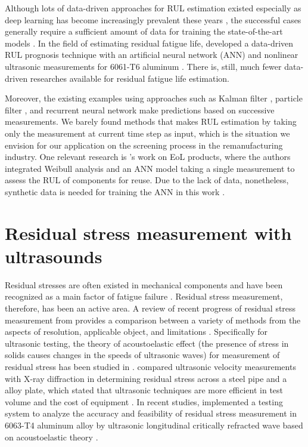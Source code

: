  Although lots of data-driven approaches for RUL estimation existed \cite{rul-review-SI20111, rul-review-LEI2018799} especially as deep learning has become increasingly prevalent these years \cite{rul-review-KHAN2018241}, the successful cases generally require a sufficient amount of data for training the state-of-the-art models \cite{rul-cnn-bearing-LI20181, rul-ensemble-bearing, rul-cnn-turbo-LI20181,rul-rnn-turbo-WU2020241, rul-gpr-battery-9040661}. In the field of estimating residual fatigue life,  developed a data-driven RUL prognosis technique with an artificial neural network (ANN) and nonlinear ultrasonic measurements for 6061-T6 aluminum \cite{rul-nn-fatigue-ultrasound-LIM2018185}. There is, still, much fewer data-driven researches available for residual fatigue life estimation. 

 Moreover, the existing examples using approaches such as Kalman filter \cite{rul-statespace-fatigue-RAY1996}, particle filter \cite{rul-statespace-fatigue-8819426}, and recurrent neural network \cite{rul-rnn-turbo-WU2020241} make predictions based on successive measurements. We barely found methods that makes RUL estimation by taking only the measurement at current time step as input, which is the situation we envision for our application on the screening process in the remanufacturing industry. One relevant research is 's work on EoL products, where the authors integrated Weibull analysis and an ANN model taking a single measurement to assess the RUL of components for reuse. Due to the lack of data, nonetheless, synthetic data is needed for training the ANN in this work \cite{rul-nn-eol-MAZHAR20071184}.


\section{Residual stress measurement with ultrasounds}
Residual stresses are often existed in mechanical components and have been recognized as a main factor of fatigue failure \cite{rs-fatigue-WEBSTER2001375}. Residual stress measurement, therefore, has been an active area. A review of recent progress of residual stress measurement from  provides a comparison between a variety of methods from the aspects of resolution, applicable object, and limitations \cite{nde-rs-review-GUO202154}. Specifically for ultrasonic testing, the theory of acoustoelastic effect (the presence of stress in solids causes changes in the speeds of ultrasonic waves) for measurement of residual stress has been studied in \cite{nde-lu-rs-Man1987}.  compared ultrasonic velocity measurements with X-ray diffraction in determining residual stress across a steel pipe and a alloy plate, which stated that ultrasonic techniques are more efficient in test volume and the cost of equipment \cite{nde-lu-rs-TANALA199583}. In recent studies,  implemented a testing system to analyze the accuracy and feasibility of residual stress measurement in 6063-T4 aluminum alloy by ultrasonic longitudinal critically refracted wave based on acoustoelastic theory \cite{nde-lu-rs-LIU2018178}.
